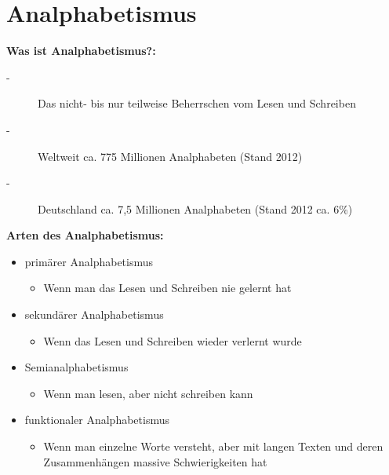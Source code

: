 \documentclass{handout}
\begin{document}
\section{Analphabetismus}
	\textbf{Was ist Analphabetismus?:}
	\begin{description}
		\item [-] Das nicht- bis nur teilweise Beherrschen vom Lesen und Schreiben
		\item [-] Weltweit ca. 775 Millionen Analphabeten (Stand 2012)
		\item [-] Deutschland ca. 7,5 Millionen Analphabeten (Stand 2012 ca. 6\%)
	\end{description}

	\textbf{Arten des Analphabetismus:}
		\begin{itemize}
    			\item primärer Analphabetismus
    				\begin{itemize}
    					\item Wenn man das Lesen und Schreiben nie gelernt hat
    				\end{itemize}
    				
			\item sekundärer Analphabetismus				
    				\begin{itemize}
    					\item Wenn das Lesen und Schreiben wieder verlernt wurde
    				\end{itemize}
				
			\item Semianalphabetismus
				\begin{itemize}
    					\item Wenn man lesen, aber nicht schreiben kann
    				\end{itemize}
    				
			\item funktionaler Analphabetismus
				\begin{itemize}
    					\item Wenn man einzelne Worte versteht, aber mit langen Texten und deren Zusammenhängen massive Schwierigkeiten hat
    				\end{itemize}
		\end{itemize}
\end{document}
